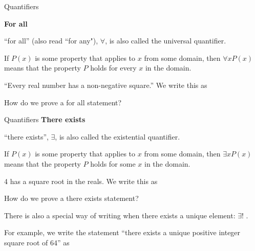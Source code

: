 \documentclass [aspectratio=169]{beamer}
\begin{document}
\begin{frame}{Quantifiers}


\textbf{For all}

\vspace{1em}

``for all'' (also read ``for any"), $\forall$, is also called the universal quantifier.  

\vspace{1em}

If $P(x)$ is some property that applies to $x$ from some domain, then $\forall x P(x)$ means that the property $P$ holds for every $x$ in the domain. 

\vspace{1em}


``Every real number has a non-negative square.'' We write this as 

\vspace{2em}

How do we prove a for all statement? 
\end{frame}

\begin{frame}{Quantifiers}
\textbf{There exists}

``there exists'', $\exists$, is also called the existential quantifier. 


If $P(x)$ is some property that applies to $x$ from some domain, then $\exists x P(x)$ means that the property $P$ holds for some $x$ in the domain. 

\vspace{1em}

4 has a square root in the reals. We write this as

\vspace{2em}

How do we prove a there exists statement?

\vspace{2em}

There is also a special way of writing when there exists a unique element: $\exists!$ .

For example, we write the statement ``there exists a unique positive integer square root of 64'' as

\vspace{2em}
\end{frame}
\end{document}
